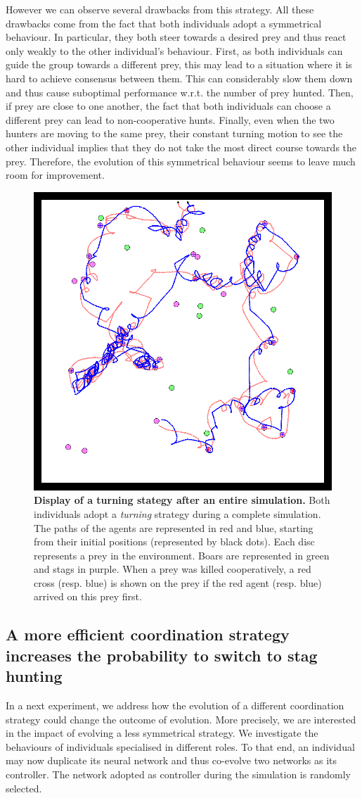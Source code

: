     However we can observe several drawbacks from this strategy. All these drawbacks come from the fact that both individuals adopt a symmetrical behaviour. In particular, they both steer towards a desired prey and thus react only weakly to the other individual's behaviour. First, as both individuals can guide the group towards a different prey, this may lead to a situation where it is hard to achieve consensus between them. This can considerably slow them down and thus cause suboptimal performance w.r.t. the number of prey hunted. Then, if prey are close to one another, the fact that both individuals can choose a different prey can lead to non-cooperative hunts. Finally, even when the two hunters are moving to the same prey, their constant turning motion to see the other individual implies that they do not take the most direct course towards the prey. Therefore, the evolution of this symmetrical behaviour seems to leave much room for improvement.

    \begin{figure}[h]
      \centering
        \includegraphics[width=0.5\linewidth]{fig/ArticleBio2/Fig3.png}
        \caption{\textbf{Display of a turning stategy after an entire simulation.}
        Both individuals adopt a \emph{turning} strategy during a complete simulation. The paths of the agents are represented in red and blue, starting from their initial positions (represented by black dots). Each disc represents a prey in the environment. Boars are represented in green and stags in purple. When a prey was killed cooperatively, a red cross (resp. blue) is shown on the prey if the red agent (resp. blue) arrived on this prey first.}
      \label{fig:figTurningBehaviour}
    \end{figure}


  \subsection{A more efficient coordination strategy increases the probability to switch to stag hunting}
    In a next experiment, we address how the evolution of a different coordination strategy could change the outcome of evolution. More precisely, we are interested in the impact of evolving a less symmetrical strategy. We investigate the behaviours of individuals specialised in different roles. To that end, an individual may now duplicate its neural network and thus co-evolve two networks as its controller. The network adopted as controller during the simulation is randomly selected.


